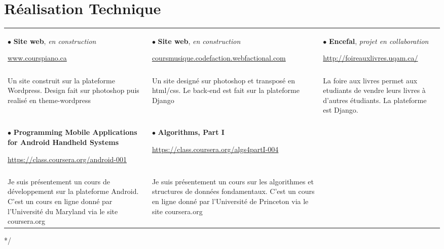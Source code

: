 \documentclass[a4paper,9pt]{extarticle}
\begin{document}
\section{Réalisation Technique}
\begin{tabular*}{\linewidth}{  
                   p{ } 
                   p{ }  
                   p{ } 
                   } 
$\bullet$ \textbf{Site web}, \textsl{en construction} \par  \href{www.courspiano.ca}{www.courspiano.ca} 

&$\bullet$ \textbf{Site web}, \textsl{en construction} \par \small\href{http://coursmusique.codefaction.webfactional.com}{coursmusique.codefaction.webfactional.com}
&$\bullet$ \textbf{Encefal}, \textsl{projet en collaboration} \par \href{http://foireauxlivres.uqam.ca/}{http://foireauxlivres.uqam.ca/} \tabularnewline \\


\vspace{-1.4em}Un site construit sur la plateforme Wordpress. Design fait sur photoshop puis realisé en theme-wordpress
& \vspace{-1.5em} Un site designé sur photoshop et transposé en html/css. Le back-end est fait sur la plateforme Django  
&\vspace{-1.5em} La foire aux livres permet aux etudiants de vendre leurs livres à d'autres étudiants. La plateforme est Django. 
\tabularnewline \\

$\bullet$ \textbf{Programming Mobile Applications for Android Handheld Systems} \par \small \href{https://class.coursera.org/android-001}{https://class.coursera.org/android-001}

&$\bullet$ \textbf{Algorithms, Part I} \par \small \href{https://class.coursera.org/algs4partI-004}{https://class.coursera.org/algs4partI-004} 

& \tabularnewline \\
\vspace{-1.5em} Je suis présentement un cours de développement sur la plateforme Android. C'est un cours en ligne donné par l'Université du Maryland via le site coursera.org

& \vspace{-1.5em} Je suis présentement un cours sur les algorithmes et structures de données fondamentaux. C'est un cours en ligne donné par l'Université de Princeton via le site coursera.org

\end{tabular*}   
*/
\end{document}
